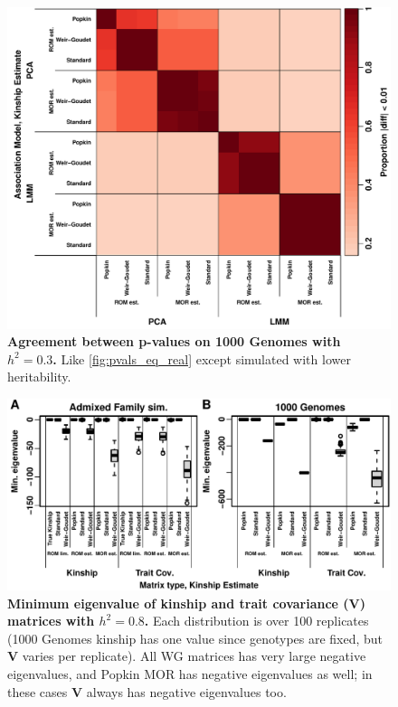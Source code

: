 \documentclass[11pt]{article}
\begin{document}
\begin{figure}[bp!]
  \centering
  \includegraphics[width=\textwidth]{tgp-nygc-autosomes_ld_prune_1000kb_0.3_maf-0.01/h-0.3/pvals_eq.pdf}
  \caption{
    {\bf Agreement between p-values on 1000 Genomes with $h^2=0.3$.}
    Like \cref{fig:pvals_eq_real} except simulated with lower heritability.
  }
  \label{fig:pvals_eq_real-h3}
\end{figure}

\begin{figure}[bp!]
  \centering
  \includegraphics[width=\textwidth]{emin.pdf}
  \caption{
    {\bf Minimum eigenvalue of kinship and trait covariance ($\mathbf{V}$) matrices with $h^2=0.8$.}
    Each distribution is over 100 replicates (1000 Genomes kinship has one value since genotypes are fixed, but $\mathbf{V}$ varies per replicate).
    All WG matrices has very large negative eigenvalues, and Popkin MOR has negative eigenvalues as well; in these cases $\mathbf{V}$ always has negative eigenvalues too.
  }
  \label{fig:emin}
\end{figure}
\end{document}
